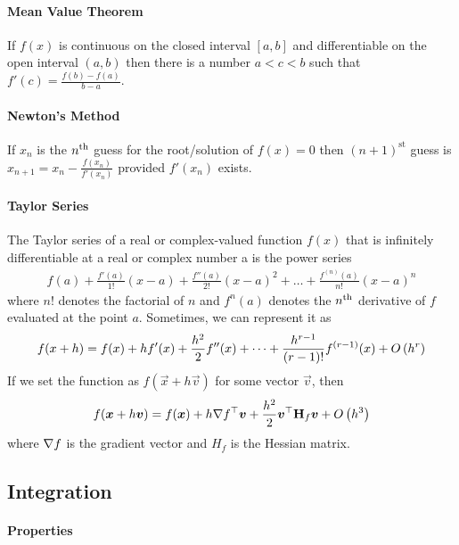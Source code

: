 \paragraph{Mean Value Theorem}

If $f(x)$ is continuous on the closed interval $[a,b]$ and differentiable on the open interval $(a,b)$ then there is a number $a<c<b$ such that $f'(c)=\frac{f(b)-f(a)}{b-a}$.

\paragraph{Newton's Method}

If $x_n$ is the $n^\text{th}$ guess for the root/solution of $f(x)=0$ then $(n+1)^\text{st}$ guess is $x_{n+1}=x_n-\frac{f(x_n)}{f'(x_n)}$ provided $f'(x_n)$ exists.

\paragraph{Taylor Series}

The Taylor series of a real or complex-valued function $f(x)$ that is infinitely differentiable at a real or complex number a is the power series
\begin{align*}
	f(a)+\frac{f'(a)}{1!}(x-a)+\frac{f''(a)}{2!}(x-a)^2+\dots+\frac{f^{(n)}(a)}{n!}(x-a)^n
\end{align*}
where $n!$ denotes the factorial of $n$ and $f^{n}(a)$ denotes the $n^\text{th}$ derivative of $f$ evaluated at the point $a$. Sometimes, we can represent it as
\begin{align*}
	f(x+h)=f(x)+hf'(x)+\frac{h^2}{2}f''(x)+\cdots+\frac{h^{r-1}}{(r-1)!}f^{(r-1)}(x)+O\left(h^r\right)
\end{align*}
If we set the function as $f(\vec{x}+h\vec{v})$ for some vector $\vec{v}$, then
\begin{align*}
	f(\boldsymbol{x}+h\boldsymbol{v})=f(\boldsymbol{x})+h\nabla f{}^\top\boldsymbol{v}+\frac{h^2}{2}\boldsymbol{v}{}^\top \mathbf{H}_f\boldsymbol{v}+O\left(h^3\right)
\end{align*}
where $\nabla f$ is the gradient vector and $H_f$ is the Hessian matrix.

\subsection{Integration}

\paragraph{Properties}

